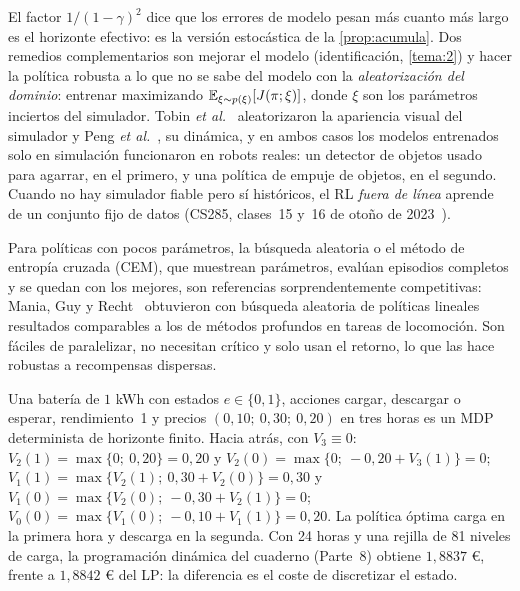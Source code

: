 El factor $1/(1-\gamma)^{2}$ dice que los errores de modelo pesan más cuanto más largo es el horizonte efectivo: es la versión estocástica de la \cref{prop:acumula}. Dos remedios complementarios son mejorar el modelo (identificación, \cref{tema:2}) y hacer la política robusta a lo que no se sabe del modelo con la \emph{aleatorización del dominio}: entrenar maximizando $\mathbb{E}_{\xi\sim p(\xi)}[J(\pi;\xi)]$, donde $\xi$ son los parámetros inciertos del simulador. Tobin \emph{et al.}~\cite{tobin} aleatorizaron la apariencia visual del simulador y Peng \emph{et al.}~\cite{peng}, su dinámica, y en ambos casos los modelos entrenados solo en simulación funcionaron en robots reales: un detector de objetos usado para agarrar, en el primero, y una política de empuje de objetos, en el segundo. Cuando no hay simulador fiable pero sí históricos, el RL \emph{fuera de línea} aprende de un conjunto fijo de datos (CS285, clases~15 y~16 de otoño de 2023~\cite{cs285}).

\begin{observacion}\label{obs:busqueda}
Para políticas con pocos parámetros, la búsqueda aleatoria o el método de entropía cruzada (CEM), que muestrean parámetros, evalúan episodios completos y se quedan con los mejores, son referencias sorprendentemente competitivas: Mania, Guy y Recht~\cite{ars} obtuvieron con búsqueda aleatoria de políticas lineales resultados comparables a los de métodos profundos en tareas de locomoción. Son fáciles de paralelizar, no necesitan crítico y solo usan el retorno, lo que las hace robustas a recompensas dispersas.
\end{observacion}

\begin{ejemplo}\label{ej:bateria-mdp}
Una batería de $1$ kWh con estados $e\in\{0,1\}$, acciones cargar, descargar o esperar, rendimiento~1 y precios $(0{,}10;\ 0{,}30;\ 0{,}20)$ en tres horas es un MDP determinista de horizonte finito. Hacia atrás, con $V_3\equiv0$: $V_2(1)=\max\{0;\ 0{,}20\}=0{,}20$ y $V_2(0)=\max\{0;\ -0{,}20+V_3(1)\}=0$; $V_1(1)=\max\{V_2(1);\ 0{,}30+V_2(0)\}=0{,}30$ y $V_1(0)=\max\{V_2(0);\ -0{,}30+V_2(1)\}=0$; $V_0(0)=\max\{V_1(0);\ -0{,}10+V_1(1)\}=0{,}20$. La política óptima carga en la primera hora y descarga en la segunda. Con 24 horas y una rejilla de 81 niveles de carga, la programación dinámica del cuaderno (Parte~8) obtiene $1{,}8837$ €, frente a $1{,}8842$ € del LP: la diferencia es el coste de discretizar el estado.
\end{ejemplo}

